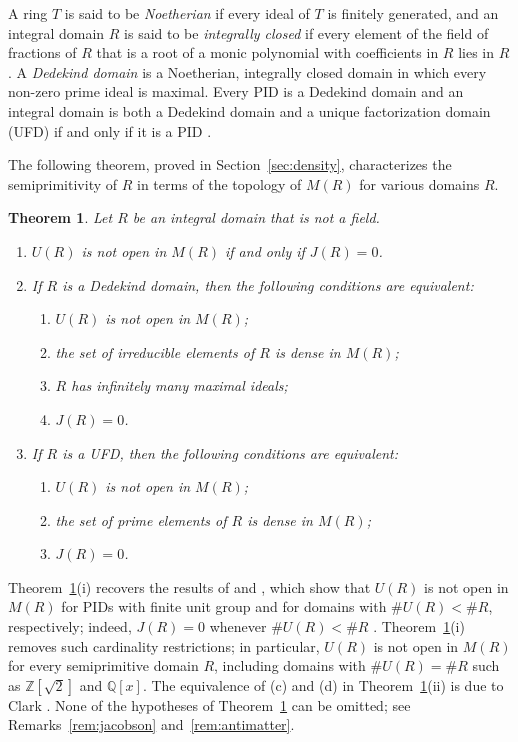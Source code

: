 \documentclass[12pt,reqno,a4paper]{amsart}
\newcommand{\Z}{\mathbb{Z}}
\newcommand{\Q}{\mathbb{Q}}
\theoremstyle{plain}
\newtheorem{theorem}{Theorem}[section]
\theoremstyle{definition}
\begin{document}
A ring $T$ is said to be \emph{Noetherian} if every ideal of $T$ is finitely generated, and an integral domain $R$ is said to be \emph{integrally closed} if every element of the field of fractions of $R$ that is a root of a monic polynomial with coefficients in $R$ lies in $R$. A \emph{Dedekind domain} is a Noetherian, integrally closed domain in which every non-zero prime ideal is maximal. Every PID is a Dedekind domain \cite[Section~16.3, Proposition~14(1)]{DummitFoote} and an integral domain is both a Dedekind domain and a unique factorization domain (UFD) if and only if it is a PID \cite[Section~16.3, Corollary~20]{DummitFoote}.

The following theorem, proved in Section~\ref{sec:density}, characterizes the semiprimitivity of $R$ in terms of the topology of $M(R)$ for various domains $R$.
\begin{theorem}\label{thm:B}
Let $R$ be an integral domain that is not a field.
\begin{enumerate}[label=\textup{(\roman*)}]
\item $U(R)$ is not open in $M(R)$ if and only if $J(R)=0$.
\item If $R$ is a Dedekind domain, then the following conditions are equivalent:
\begin{enumerate}[label=\textup{(\alph*)}]
\item $U(R)$ is not open in $M(R)$;
\item the set of irreducible elements of $R$ is dense in $M(R)$;
\item $R$ has infinitely many maximal ideals;
\item $J(R)=0$.
\end{enumerate}
\item If $R$ is a UFD, then the following conditions are equivalent:
\begin{enumerate}[label=\textup{(\alph*)}]
\item $U(R)$ is not open in $M(R)$;
\item the set of prime elements of $R$ is dense in $M(R)$;
\item $J(R)=0$.
\end{enumerate}
\end{enumerate}
\end{theorem}

Theorem~\ref{thm:B}(i) recovers the results of \cite[Section~3]{MaciasDomains} and \cite[Theorem~4.4]{MaciasOrtiz}, which show that $U(R)$ is not open in $M(R)$ for PIDs with finite unit group and for domains with $\#U(R)<\#R$, respectively; indeed, $J(R)=0$ whenever $\#U(R)<\#R$ \cite[Proposition~2.2 and Corollary~4.3]{Clark}. Theorem~\ref{thm:B}(i) removes such cardinality restrictions; in particular, $U(R)$ is not open in $M(R)$ for every semiprimitive domain $R$, including domains with $\#U(R)=\#R$ such as $\Z[\sqrt2]$ and $\Q[x]$. The equivalence of (c) and (d) in Theorem~\ref{thm:B}(ii) is due to Clark \cite[Theorem~4.8]{Clark}. None of the hypotheses of Theorem~\ref{thm:B} can be omitted; see Remarks~\ref{rem:jacobson} and~\ref{rem:antimatter}.
\end{document}
